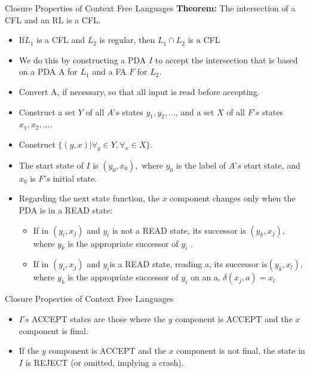 \documentclass{beamer}
\begin{document}
\begin{frame}{Closure Properties of Context Free Languages}
	\textbf{Theorem:} The intersection of a CFL and an RL is a CFL.
\begin{itemize}
	\item If$ L_1$ is a CFL and $L_2$ is regular, then $L_1 \cap L_2$ is a CFL
\end{itemize}
\proofname
\begin{itemize}
	\item We do this by constructing a PDA $I$ to accept the intersection that
	is based on a PDA A for $L_1$ and a FA $F$ for $L_2.$
	\item Convert A, if necessary, so that all input is read before accepting.
	\item Construct a set $Y$ of all $A’s$ states $y_1, y_2,...$, and a set $X$ of all $F’s$ states $x_1, x_2,....$
	\item Construct $\{(y, x) | \forall_y \in Y, \forall_x \in X\}$.
	\item The start state of $I$ is $(y_0, x_0),$ where $y_0$ is the label of $A’s$ start state,	and $x_0$ is $F’s$ initial state.
	\item Regarding the next state function, the $x$ component changes only
	when the PDA is in a READ state:
	\begin{itemize}
		\item If in $(y_i, x_j)$ and $y_i$	is not a READ state, its successor is $(y_k, x_j),$where $y_k$ is the appropriate successor of $y_i$		.
		\item If in $(y_i, x_j)$ and $y_i$is a READ state, reading a, its successor is$(y_k, x_l),$ where $y_k$ is the appropriate successor of $y_i$ on an a,
		$\delta(x_j	, a) = x_l$
	\end{itemize}
\end{itemize}
\end{frame}
\begin{frame}{Closure Properties of Context Free Languages}
		\begin{itemize}
		\item $I’s$ ACCEPT states are those where the $y$ component is ACCEPT
		and the $x$ component is final.
		\item If the $y$ component is ACCEPT and the $x$ component is not final, the
		state in $I$ is REJECT (or omitted, implying a crash).
	\end{itemize}

\end{frame}
\end{document}
